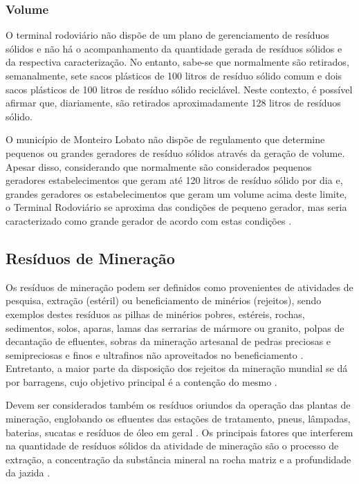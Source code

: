 \subsubsection{Volume}
O terminal rodoviário não dispõe de um plano de gerenciamento de resíduos sólidos e não há o acompanhamento da quantidade gerada de resíduos sólidos e da respectiva caracterização. No entanto, sabe-se que normalmente são retirados, semanalmente, sete sacos plásticos de 100 litros de resíduo sólido comum e dois sacos plásticos de 100 litros de resíduo sólido reciclável. Neste contexto, é possível afirmar que, diariamente, são retirados aproximadamente 128 litros de resíduos sólido.

O município de Monteiro Lobato não dispõe de regulamento que determine pequenos ou grandes geradores de resíduo sólidos através da geração de volume. Apesar disso, considerando que normalmente são considerados pequenos geradores estabelecimentos que geram até 120 litros de resíduo sólido por dia e, grandes geradores os estabelecimentos que geram um volume acima deste limite, o Terminal Rodoviário se aproxima das condições de pequeno gerador, mas seria caracterizado como grande gerador de acordo com estas condições \cite{ibam:2001}.


\subsection{Resíduos de Mineração}
Os resíduos de mineração podem ser definidos como provenientes de atividades de pesquisa, extração (estéril) ou beneficiamento de minérios (rejeitos), sendo exemplos destes resíduos as pilhas de minérios pobres, estéreis, rochas, sedimentos, solos, aparas, lamas das serrarias de mármore ou granito, polpas de decantação de efluentes, sobras da mineração artesanal de pedras preciosas e semipreciosas e finos e ultrafinos não aproveitados no beneficiamento \cite{IBRAM2016}. Entretanto, a maior parte da disposição dos rejeitos da mineração mundial se dá por barragens, cujo objetivo principal é a contenção do mesmo \cite{MME:2017, IBRAM2016}.

Devem ser considerados também os resíduos oriundos da operação das plantas de mineração, englobando os efluentes das estações de tratamento, pneus, lâmpadas, baterias, sucatas e resíduos de óleo em geral \cite{IBRAM2016}. Os principais fatores que interferem na quantidade de resíduos sólidos da atividade de mineração são o processo de extração, a concentração da substância mineral na rocha matriz e a profundidade da jazida \cite{IPEA2012c}.

